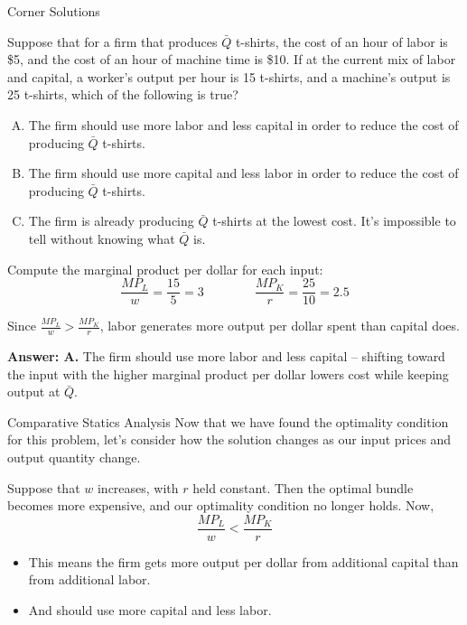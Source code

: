 \documentclass{beamer}
\begin{document}
\begin{frame}{Corner Solutions}

  \bigskip
  Suppose that for a firm that produces $\bar{Q}$ t-shirts, the cost of an hour of labor is \$5, and the cost of an hour of machine time is \$10. If at the current mix of labor and capital, a worker's output per hour is 15 t-shirts, and a machine's output is 25 t-shirts, which of the following is true?

  \bigskip
  \begin{enumerate}[A)]
    \item The firm should use more labor and less capital in order to reduce the cost of producing $\bar{Q}$ t-shirts.
    \item The firm should use more capital and less labor in order to reduce the cost of producing $\bar{Q}$ t-shirts.
    \item The firm is already producing $\bar{Q}$ t-shirts at the lowest cost.
    It's impossible to tell without knowing what $\bar{Q}$ is.
  \end{enumerate}
\end{frame}

\begin{frame}

  \bigskip
  Compute the marginal product per dollar for each input:
  $$
    \frac{MP_L}{w} = \frac{15}{5} = 3
    \qquad\qquad
    \frac{MP_K}{r} = \frac{25}{10} = 2.5
  $$

  \bigskip
  Since $\frac{MP_L}{w} > \frac{MP_K}{r}$, labor generates more output per dollar spent than capital does.

  \bigskip
  \textbf{Answer: A.} The firm should use more labor and less capital -- shifting toward the input with the higher marginal product per dollar lowers cost while keeping output at $\bar{Q}$.
\end{frame}

\begin{frame}{Comparative Statics Analysis}
  Now that we have found the optimality condition for this problem, let's consider how the solution changes as our input prices and output quantity change.
  
  \bigskip
  Suppose that $w$ increases, with $r$ held constant. Then the optimal bundle becomes more expensive, and our optimality condition no longer holds. Now,
  $$
    \frac{MP_L}{w} < \frac{MP_K}{r}
  $$

  \begin{itemize}
    \item This means the firm gets more output per dollar from additional capital than from additional labor.
    
    \item And should use more capital and less labor.
  \end{itemize}
\end{frame}
\end{document}
